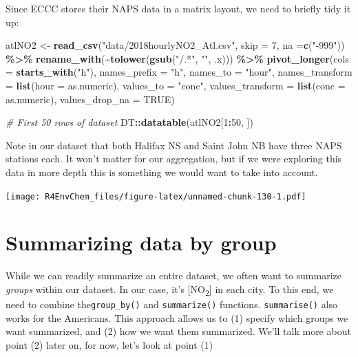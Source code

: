 \documentclass[
]{book}
\newenvironment{Shaded}{\begin{snugshade}}{\end{snugshade}}
\newcommand{\AttributeTok}[1]{\textcolor[rgb]{0.13,0.29,0.53}{#1}}
\newcommand{\CommentTok}[1]{\textcolor[rgb]{0.56,0.35,0.01}{\textit{#1}}}
\newcommand{\ConstantTok}[1]{\textcolor[rgb]{0.56,0.35,0.01}{#1}}
\newcommand{\DecValTok}[1]{\textcolor[rgb]{0.00,0.00,0.81}{#1}}
\newcommand{\FunctionTok}[1]{\textcolor[rgb]{0.13,0.29,0.53}{\textbf{#1}}}
\newcommand{\NormalTok}[1]{#1}
\newcommand{\OtherTok}[1]{\textcolor[rgb]{0.56,0.35,0.01}{#1}}
\newcommand{\SpecialCharTok}[1]{\textcolor[rgb]{0.81,0.36,0.00}{\textbf{#1}}}
\newcommand{\StringTok}[1]{\textcolor[rgb]{0.31,0.60,0.02}{#1}}
\begin{document}
Since ECCC stores their NAPS data in a matrix layout, we need to briefly tidy it up:

\begin{Shaded}
\begin{Highlighting}[]
\NormalTok{atlNO2 }\OtherTok{\textless{}{-}} \FunctionTok{read\_csv}\NormalTok{(}\StringTok{"data/2018hourlyNO2\_Atl.csv"}\NormalTok{, }\AttributeTok{skip =} \DecValTok{7}\NormalTok{, }\AttributeTok{na =}\FunctionTok{c}\NormalTok{(}\StringTok{"{-}999"}\NormalTok{)) }\SpecialCharTok{\%\textgreater{}\%}
  \FunctionTok{rename\_with}\NormalTok{(}\SpecialCharTok{\textasciitilde{}}\FunctionTok{tolower}\NormalTok{(}\FunctionTok{gsub}\NormalTok{(}\StringTok{"/.*"}\NormalTok{, }\StringTok{""}\NormalTok{, .x))) }\SpecialCharTok{\%\textgreater{}\%}
  \FunctionTok{pivot\_longer}\NormalTok{(}\AttributeTok{cols =} \FunctionTok{starts\_with}\NormalTok{(}\StringTok{"h"}\NormalTok{), }
               \AttributeTok{names\_prefix =} \StringTok{"h"}\NormalTok{, }
               \AttributeTok{names\_to =} \StringTok{"hour"}\NormalTok{, }
               \AttributeTok{names\_transform =} \FunctionTok{list}\NormalTok{(}\AttributeTok{hour =}\NormalTok{ as.numeric),}
               \AttributeTok{values\_to =} \StringTok{"conc"}\NormalTok{, }
               \AttributeTok{values\_transform =} \FunctionTok{list}\NormalTok{(}\AttributeTok{conc =}\NormalTok{ as.numeric),}
               \AttributeTok{values\_drop\_na =} \ConstantTok{TRUE}\NormalTok{) }

\CommentTok{\# First 50 rows of dataset}
\NormalTok{DT}\SpecialCharTok{::}\FunctionTok{datatable}\NormalTok{(atlNO2[}\DecValTok{1}\SpecialCharTok{:}\DecValTok{50}\NormalTok{, ])}
\end{Highlighting}
\end{Shaded}

Note in our dataset that both Halifax NS and Saint John NB have three NAPS stations each. It won't matter for our aggregation, but if we were exploring this data in more depth this is something we would want to take into account.

\texttt{[image: R4EnvChem\_files/figure-latex/unnamed-chunk-130-1.pdf]}

\hypertarget{summarizing-data-by-group}{%
\section{Summarizing data by group}\label{summarizing-data-by-group}}

While we can readily summarize an entire dataset, we often want to summarize \emph{groups} within our dataset. In our case, it's {[}NO\textsubscript{2}{]} in each city. To this end, we need to combine the\texttt{group\_by()} and \texttt{summarize()} functions. \texttt{summarise()} also works for the Americans. This approach allows us to (1) specify which groups we want summarized, and (2) how we want them summarized. We'll talk more about point (2) later on, for now, let's look at point (1)
\end{document}
